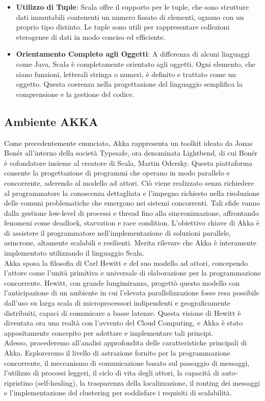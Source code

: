 \begin{itemize}
  \item \textbf{Utilizzo di Tuple}: Scala offre il supporto per le tuple, che sono strutture dati immutabili contenenti un numero fissato di elementi, ognuno con un proprio tipo distinto.
  Le tuple sono utili per rappresentare collezioni eterogenee di dati in modo conciso ed efficiente.
  \item \textbf{Orientamento Completo agli Oggetti}: A differenza di alcuni linguaggi come Java, Scala è completamente orientato agli oggetti.
  Ogni elemento, che siano funzioni, letterali stringa o numeri, è definito e trattato come un oggetto.
  Questa coerenza nella progettazione del linguaggio semplifica la comprensione e la gestione del codice.
\end{itemize}

\subsection[AKKA]{Ambiente AKKA}
Come precedentemente enunciato, Akka rappresenta un toolkit ideato da Jonas Bonér all'interno della società Typesafe, ora denominata Lightbend, di cui Bonér è cofondatore insieme al creatore di Scala, Martin Odersky.
Questa piattaforma consente la progettazione di programmi che operano in modo parallelo e concorrente, aderendo al modello ad attori.
Ciò viene realizzato senza richiedere al programmatore la conoscenza dettagliata e l'impegno richiesto nella risoluzione delle comuni problematiche che emergono nei sistemi concorrenti.
Tali sfide vanno dalla gestione low-level di processi e thread fino alla sincronizzazione, affrontando fenomeni come deadlock, starvation e race condition.
L'obiettivo chiave di Akka è di assistere il programmatore nell'implementazione di soluzioni parallele, asincrone, altamente scalabili e resilienti.
Merita rilevare che Akka è interamente implementato utilizzando il linguaggio Scala. \\
Akka sposa la filosofia di Carl Hewitt e del suo modello ad attori, concependo l'attore come l'unità primitiva e universale di elaborazione per la programmazione concorrente.
Hewitt, con grande lungimiranza, progettò questo modello con l'anticipazione di un ambiente in cui l'elevata parallelizzazione fosse resa possibile dall'uso su larga scala di microprocessori indipendenti e geograficamente distribuiti, capaci di comunicare a basse latenze.
Questa visione di Hewitt è diventata ora una realtà con l'avvento del Cloud Computing, e Akka è stato appositamente concepito per adottare e implementare tali principi. \\
Adesso, procederemo all'analisi approfondita delle caratteristiche principali di Akka. 
Esploreremo il livello di astrazione fornito per la programmazione concorrente, il meccanismo di comunicazione basato sul passaggio di messaggi, l'utilizzo di processi leggeri, il ciclo di vita degli attori, la capacità di auto-ripristino (self-healing), la trasparenza della localizzazione, il routing dei messaggi e l'implementazione del clustering per soddisfare i requisiti di scalabilità.

